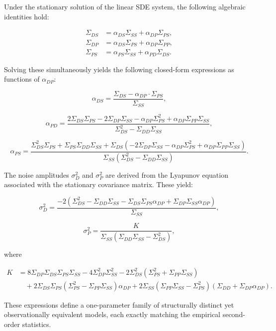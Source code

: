 \documentclass[
]{article}
\begin{document}
Under the stationary solution of the linear SDE system, the following
algebraic identities hold:

\[
\begin{aligned}
\Sigma_{DS} &= \alpha_{DS} \Sigma_{SS} + \alpha_{DP} \Sigma_{PS}, \\
\Sigma_{DP} &= \alpha_{DS} \Sigma_{PS} + \alpha_{DP} \Sigma_{PP}, \\
\Sigma_{PS} &= \alpha_{PS} \Sigma_{SS} + \alpha_{PD} \Sigma_{DS}.
\end{aligned}
\]

Solving these simultaneously yields the following closed-form
expressions as functions of \(\alpha_{DP}\):

\[
\alpha_{DS} = \frac{\Sigma_{DS} - \alpha_{DP} \cdot \Sigma_{PS}}{\Sigma_{SS}},
\]

\[
\alpha_{PD} = \frac{2 \Sigma_{DS} \Sigma_{PS} - 2 \Sigma_{DP} \Sigma_{SS} - \alpha_{DP} \Sigma_{PS}^2 + \alpha_{DP} \Sigma_{PP} \Sigma_{SS}}{\Sigma_{DS}^2 - \Sigma_{DD} \Sigma_{SS}},
\]

\[
\alpha_{PS} = \frac{
\Sigma_{DS}^2 \Sigma_{PS}
+ \Sigma_{PS} \Sigma_{DD} \Sigma_{SS}
+ \Sigma_{DS}(-2 \Sigma_{DP} \Sigma_{SS} - \alpha_{DP} \Sigma_{PS}^2 + \alpha_{DP} \Sigma_{PP} \Sigma_{SS})
}{
\Sigma_{SS}(\Sigma_{DS}^2 - \Sigma_{DD} \Sigma_{SS})
}.
\]

The noise amplitudes \(\sigma_D^2\) and \(\sigma_P^2\) are derived from
the Lyapunov equation associated with the stationary covariance matrix.
These yield:

\[
\sigma_D^2 = \frac{-2 \left(\Sigma_{DS}^2 - \Sigma_{DD} \Sigma_{SS} - \Sigma_{DS} \Sigma_{PS} \alpha_{DP} + \Sigma_{DP} \Sigma_{SS} \alpha_{DP} \right)}{\Sigma_{SS}},
\]

\[
\sigma_P^2 = \frac{K}{\Sigma_{SS} (\Sigma_{DD} \Sigma_{SS} - \Sigma_{DS}^2)},
\]

where

\[
\begin{aligned}
K &= 8 \Sigma_{DP} \Sigma_{DS} \Sigma_{PS} \Sigma_{SS}
- 4 \Sigma_{DP}^2 \Sigma_{SS}^2
- 2 \Sigma_{DS}^2 (\Sigma_{PS}^2 + \Sigma_{PP} \Sigma_{SS}) \\
&\quad + 2 \Sigma_{DS} \Sigma_{PS} (\Sigma_{PS}^2 - \Sigma_{PP} \Sigma_{SS}) \alpha_{DP}
+ 2 \Sigma_{SS} (\Sigma_{PP} \Sigma_{SS} - \Sigma_{PS}^2)(\Sigma_{DD} + \Sigma_{DP} \alpha_{DP}).
\end{aligned}
\]

These expressions define a one-parameter family of structurally distinct
yet observationally equivalent models, each exactly matching the
empirical second-order statistics.
\end{document}
